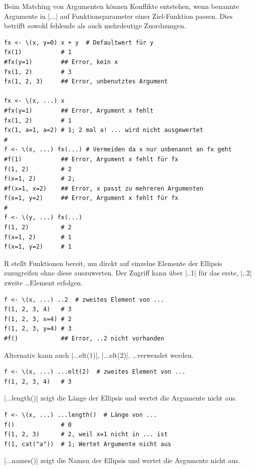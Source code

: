 \documentclass[10pt,twocolumn]{scrartcl}
\renewcommand{\lstinline}{\mycoloredinline}
\begin{document}
Beim Matching von Argumenten können Konflikte entstehen, wenn benannte
Argumente in \lstinline|...| auf Funktionsparameter einer Ziel-Funktion passen.
Dies betrifft sowohl fehlende als auch mehrdeutige Zuordnungen.

\begin{lstlisting}
fx <- \(x, y=0) x + y  # Defaultwert für y
fx(1)           # 1
#fx(y=1)        ## Error, kein x
fx(1, 2)        # 3
fx(1, 2, 3)     ## Error, unbenutztes Argument

fx <- \(x, ...) x
#fx(y=1)        ## Error, Argument x fehlt
fx(1, 2)        # 1
fx(1, a=1, a=2) # 1; 2 mal a! ... wird nicht ausgewertet
#
f <- \(x, ...) fx(...) # Vermeiden da x nur unbenannt an fx geht
#f(1)           ## Error, Argument x fehlt für fx
f(1, 2)         # 2
f(x=1, 2)       # 2; 
#f(x=1, x=2)    ## Error, x passt zu mehreren Argumenten
f(x=1, y=2)     ## Error, Argument x fehlt für fx
#
f <- \(y, ...) fx(...)
f(1, 2)         # 2
f(x=1, 2)       # 1
f(x=1, y=2)     # 1
\end{lstlisting}

R stellt Funktionen bereit, um direkt auf einzelne Elemente der
Ellipsis zuzugreifen ohne diese auszuwerten. Der Zugriff kann über \lstinline|..1| für das erste, \lstinline|..2| zweite \dots Element erfolgen.

\begin{lstlisting}
f <- \(x, ...) ..2  # zweites Element von ...
f(1, 2, 3, 4)   # 3
f(1, 2, 3, x=4) # 2
f(1, 2, 3, y=4) # 3
#f()            ## Error, ..2 nicht vorhanden
\end{lstlisting}

Alternativ kann auch \lstinline|...elt(1)|, \lstinline|...elt(2)|, \dots verwendet werden.

\begin{lstlisting}
f <- \(x, ...) ...elt(2)  # zweites Element von ...
f(1, 2, 3, 4)   # 3
\end{lstlisting}

\lstinline|...length()| zeigt die Länge der Ellipsis und wertet die Argumente nicht aus.

\begin{lstlisting}
f <- \(x, ...) ...length()  # Länge von ...
f()             # 0
f(1, 2, 3)      # 2, weil x=1 nicht in ... ist
f(1, cat("a"))  # 1; Wertet Argumente nicht aus
\end{lstlisting}

\lstinline|...names()| zeigt die Namen der Ellipsis und wertet die Argumente nicht aus.
\end{document}

